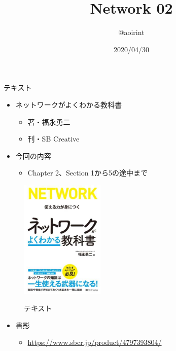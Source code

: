 \documentclass[12pt,aspectratio=169]{beamer}
\title{Network 02}
\author{@aoirint}
\date{2020/04/30}
\begin{document}
\frame{\maketitle}

\begin{frame}{テキスト}

  \begin{minipage}{0.58\textwidth}
    \begin{itemize}
      \item ネットワークがよくわかる教科書
      \begin{itemize}
        \item 著・福永勇二
        \item 刊・SB Creative
      \end{itemize}
      \item 今回の内容
        \begin{itemize}
          \item Chapter 2、Section 1から5の途中まで
        \end{itemize}

    \end{itemize}

  \end{minipage}
  \hfill
  \begin{minipage}{0.38\textwidth}
    \vspace{-1\baselineskip}
    \begin{figure}[h]
      \centering
      \includegraphics[width=4cm,bb=0 0 420 596]{./figures/networkbook.jpg}
      \label{fig:networkbook}
      \caption{テキスト}
    \end{figure}
  \end{minipage}

  \begin{itemize}
    \item 書影
    \begin{itemize}
      \item { \small \url{https://www.sbcr.jp/product/4797393804/} }
    \end{itemize}
  \end{itemize}

\end{frame}
\end{document}
